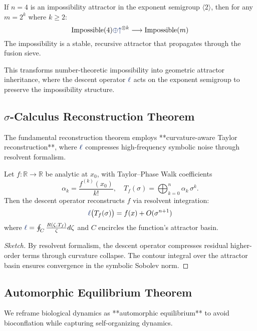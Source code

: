 \begin{theorem}
If $n=4$ is an impossibility attractor in the exponent semigroup $\langle 2 \rangle$, then for any $m = 2^k$ where $k \geq 2$:
\[ \text{Impossible}(4) \fuse \grow^{\otimes k} \longrightarrow \text{Impossible}(m) \]
The impossibility is a stable, recursive attractor that propagates through the fusion sieve.
\end{theorem}

This transforms number-theoretic impossibility into geometric attractor inheritance, where the descent operator $\lha$ acts on the exponent semigroup to preserve the impossibility structure.

\subsection{$\sigma$-Calculus Reconstruction Theorem}
The fundamental reconstruction theorem employs **curvature-aware Taylor reconstruction**, where $\lha$ compresses high-frequency symbolic noise through resolvent formalism.

\begin{theorem}
Let $f\colon \mathbb{R}\to\mathbb{R}$ be analytic at $x_0$, with Taylor--Phase Walk coefficients
\[
  \alpha_k = \frac{f^{(k)}(x_0)}{k!}, \quad T_f(\sigma) = \bigoplus_{k=0}^n \alpha_k\,\sigma^k.
\]
Then the descent operator reconstructs $f$ via resolvent integration:
\[
  \lha\bigl(T_f(\sigma)\bigr) = f(x) + O(\sigma^{n+1})
\]
where $\lha = \oint_C \frac{R(\zeta, T_f)}{\zeta} d\zeta$ and $C$ encircles the function's attractor basin.
\end{theorem}

\begin{proof}[Sketch]
By resolvent formalism, the descent operator compresses residual higher-order terms through curvature collapse. The contour integral over the attractor basin ensures convergence in the symbolic Sobolev norm.
\end{proof}

\subsection{Automorphic Equilibrium Theorem}
We reframe biological dynamics as **automorphic equilibrium** to avoid bioconflation while capturing self-organizing dynamics.

